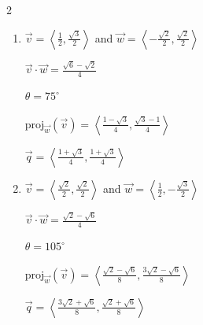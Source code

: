\documentclass{ximera}
\begin{document}
\begin{multicols}{2} \raggedcolumns 
\begin{enumerate}
\setcounter{enumi}{\value{HW}}

\item $\overrightarrow{v} = \left\langle \frac{1}{2}, \frac{\sqrt{3}}{2} \right\rangle$ and $\overrightarrow{w} = \left\langle -\frac{\sqrt{2}}{2}, \frac{\sqrt{2}}{2} \right\rangle$

 $\overrightarrow{v} \cdot \overrightarrow{w} = \frac{\sqrt{6} - \sqrt{2}}{4}$

 $\theta = 75^{\circ}$ 

 $\text{proj}_{\overrightarrow{w}}(\overrightarrow{v}) = \left\langle \frac{1-\sqrt{3}}{4}, \frac{\sqrt{3} - 1}{4} \right\rangle$

 $\overrightarrow{q} = \left\langle \frac{1+\sqrt{3}}{4}, \frac{1 +\sqrt{3}}{4} \right\rangle$
 \vfill
 
\item $\overrightarrow{v} = \left\langle \frac{\sqrt{2}}{2}, \frac{\sqrt{2}}{2} \right\rangle$ and $\overrightarrow{w} = \left\langle \frac{1}{2}, -\frac{\sqrt{3}}{2} \right\rangle$

 $\overrightarrow{v} \cdot \overrightarrow{w} = \frac{\sqrt{2} - \sqrt{6}}{4}$

 $\theta  = 105^{\circ}$ 

 $\text{proj}_{\overrightarrow{w}}(\overrightarrow{v}) = \left\langle \frac{\sqrt{2}-\sqrt{6}}{8}, \frac{3\sqrt{2} - \sqrt{6}}{8} \right\rangle$

 $\overrightarrow{q} =  \left\langle \frac{3\sqrt{2}+\sqrt{6}}{8}, \frac{\sqrt{2} + \sqrt{6}}{8} \right\rangle$

\setcounter{HW}{\value{enumi}}
\end{enumerate}
\end{multicols}
\end{document}
